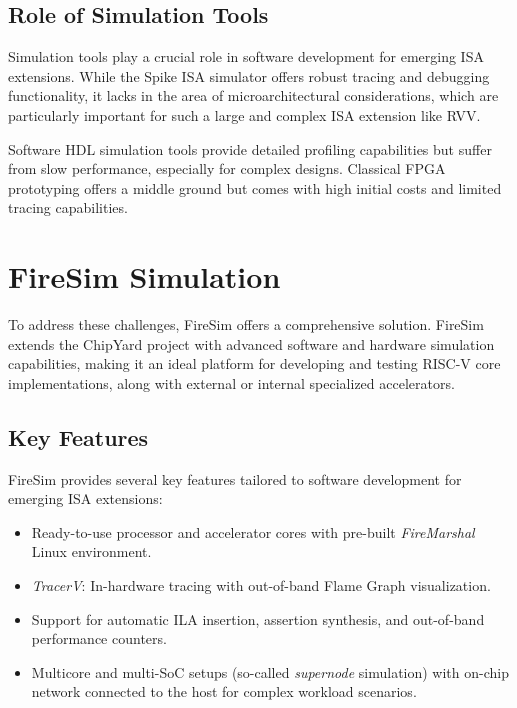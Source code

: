 \documentclass[
	a4paper, %
	10pt, %
	unnumberedsections, %
	twoside, %
]{LTJournalArticle}
\begin{document}
\subsection{Role of Simulation Tools}

Simulation tools play a crucial role in software development for emerging ISA
extensions. While the Spike ISA simulator offers robust tracing and debugging
functionality, it lacks in the area of microarchitectural considerations, which
are particularly important for such a large and complex ISA extension like RVV.

Software HDL simulation tools provide detailed profiling capabilities but suffer
from slow performance, especially for complex designs. Classical FPGA
prototyping offers a middle ground but comes with high initial costs and limited
tracing capabilities.

\section{FireSim Simulation}

To address these challenges, FireSim\autocite{ISCA-50} offers a comprehensive
solution. FireSim extends the ChipYard\autocite{chipyard} project with advanced
software and hardware simulation capabilities, making it an ideal platform for
developing and testing RISC-V core implementations, along with external or
internal specialized accelerators.

\subsection{Key Features}

FireSim provides several key features tailored to software development for
emerging ISA extensions:

\begin{itemize}
  \item Ready-to-use processor and accelerator cores with pre-built
        \emph{FireMarshal} Linux environment.
  \item \emph{TracerV}: %
        In-hardware tracing with out-of-band Flame Graph visualization.
  \item Support for automatic ILA insertion, assertion synthesis, and
        out-of-band performance counters.
  \item Multicore and multi-SoC setups (so-called \emph{supernode} simulation)
        with on-chip network connected to the host for complex workload
        scenarios.
\end{itemize}
\end{document}

